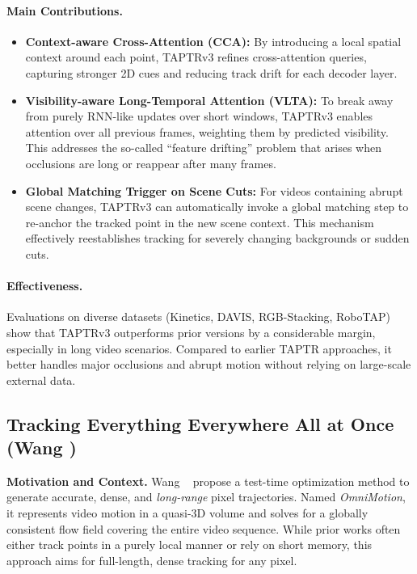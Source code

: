 \documentclass[11pt]{article}
\begin{document}
\paragraph{Main Contributions.}
\begin{itemize}
\item \textbf{Context-aware Cross-Attention (CCA):} By introducing a local spatial context around each point, TAPTRv3 refines cross-attention queries, capturing stronger 2D cues and reducing track drift for each decoder layer.
\item \textbf{Visibility-aware Long-Temporal Attention (VLTA):} To break away from purely RNN-like updates over short windows, TAPTRv3 enables attention over all previous frames, weighting them by predicted visibility. This addresses the so-called “feature drifting” problem that arises when occlusions are long or reappear after many frames.
\item \textbf{Global Matching Trigger on Scene Cuts:} For videos containing abrupt scene changes, TAPTRv3 can automatically invoke a global matching step to re-anchor the tracked point in the new scene context. This mechanism effectively reestablishes tracking for severely changing backgrounds or sudden cuts.
\end{itemize}

\paragraph{Effectiveness.}
Evaluations on diverse datasets (Kinetics, DAVIS, RGB-Stacking, RoboTAP) show that TAPTRv3 outperforms prior versions by a considerable margin, especially in long video scenarios. Compared to earlier TAPTR approaches, it better handles major occlusions and abrupt motion without relying on large-scale external data.

\subsection{Tracking Everything Everywhere All at Once (Wang \etal)}
\textbf{Motivation and Context.}
Wang \etal~\cite{wang2023tracking} propose a test-time optimization method to generate accurate, dense, and \emph{long-range} pixel trajectories. Named \emph{OmniMotion}, it represents video motion in a quasi-3D volume and solves for a globally consistent flow field covering the entire video sequence. While prior works often either track points in a purely local manner or rely on short memory, this approach aims for full-length, dense tracking for any pixel.
\end{document}
